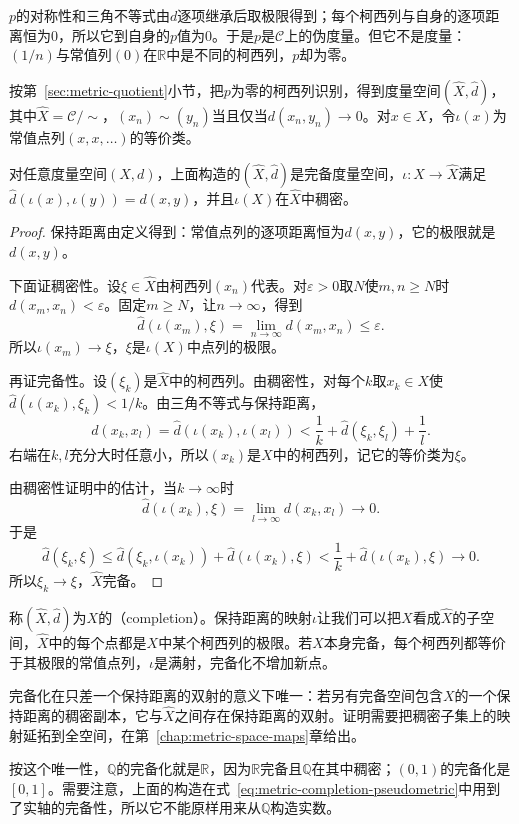 $p$的对称性和三角不等式由$d$逐项继承后取极限得到；每个柯西列与自身的逐项距离恒为$0$，所以它到自身的$p$值为$0$。于是$p$是$\mathcal C$上的伪度量。但它不是度量：$(1/n)$与常值列$(0)$在$\mathbb R$中是不同的柯西列，$p$却为零。

按第~\ref{sec:metric-quotient}小节，把$p$为零的柯西列识别，得到度量空间$(\hat X,\hat d)$，其中$\hat X=\mathcal C/{\sim}$，$(x_n)\sim(y_n)$当且仅当$d(x_n,y_n)\to0$。对$x\in X$，令$\iota(x)$为常值点列$(x,x,\ldots)$的等价类。

\begin{theorem}[完备化]
\label{thm:metric-completion}
对任意度量空间$(X,d)$，上面构造的$(\hat X,\hat d)$是完备度量空间，$\iota:X\to\hat X$满足$\hat d(\iota(x),\iota(y))=d(x,y)$，并且$\iota(X)$在$\hat X$中稠密。
\end{theorem}

\begin{proof}
保持距离由定义得到：常值点列的逐项距离恒为$d(x,y)$，它的极限就是$d(x,y)$。

下面证稠密性。设$\xi\in\hat X$由柯西列$(x_n)$代表。对$\varepsilon>0$取$N$使$m,n\geq N$时$d(x_m,x_n)<\varepsilon$。固定$m\geq N$，让$n\to\infty$，得到
\[
\hat d(\iota(x_m),\xi)=\lim_{n\to\infty}d(x_m,x_n)\leq\varepsilon.
\]
所以$\iota(x_m)\to\xi$，$\xi$是$\iota(X)$中点列的极限。

再证完备性。设$(\xi_k)$是$\hat X$中的柯西列。由稠密性，对每个$k$取$x_k\in X$使$\hat d(\iota(x_k),\xi_k)<1/k$。由三角不等式与保持距离，
\[
d(x_k,x_l)=\hat d(\iota(x_k),\iota(x_l))<\frac1k+\hat d(\xi_k,\xi_l)+\frac1l.
\]
右端在$k,l$充分大时任意小，所以$(x_k)$是$X$中的柯西列，记它的等价类为$\xi$。

由稠密性证明中的估计，当$k\to\infty$时
\[
\hat d(\iota(x_k),\xi)=\lim_{l\to\infty}d(x_k,x_l)\to0.
\]
于是
\[
\hat d(\xi_k,\xi)\leq\hat d(\xi_k,\iota(x_k))+\hat d(\iota(x_k),\xi)<\frac1k+\hat d(\iota(x_k),\xi)\to0.
\]
所以$\xi_k\to\xi$，$\hat X$完备。
\end{proof}

称$(\hat X,\hat d)$为$X$的（completion）。保持距离的映射$\iota$让我们可以把$X$看成$\hat X$的子空间，$\hat X$中的每个点都是$X$中某个柯西列的极限。若$X$本身完备，每个柯西列都等价于其极限的常值点列，$\iota$是满射，完备化不增加新点。

完备化在只差一个保持距离的双射的意义下唯一：若另有完备空间包含$X$的一个保持距离的稠密副本，它与$\hat X$之间存在保持距离的双射。证明需要把稠密子集上的映射延拓到全空间，在第~\ref{chap:metric-space-maps}章给出。

按这个唯一性，$\mathbb Q$的完备化就是$\mathbb R$，因为$\mathbb R$完备且$\mathbb Q$在其中稠密；$(0,1)$的完备化是$[0,1]$。需要注意，上面的构造在式~\eqref{eq:metric-completion-pseudometric}中用到了实轴的完备性，所以它不能原样用来从$\mathbb Q$构造实数。

